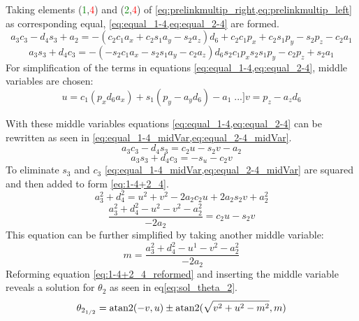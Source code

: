 Taking elements (\textcolor{green}{1},\textcolor{red}{4}) and (\textcolor{green}{2},\textcolor{red}{4}) of \cref{eq:prelinkmultip_right,eq:prelinkmultip_left} as corresponding equal,  \cref{eq:equal_1-4,eq:equal_2-4} are formed.
\begin{equation}\label{eq:equal_1-4}
	a_3 c_3 - d_4 s_3 + a_2 = - (c_2 c_1 a_x + c_2 s_1 a_y -s_2 a_z)d_6 + c_2 c_1 p_x + c_2 s_1 p_y -s_2 p_z -c_2 a_1
\end{equation}
\begin{equation}\label{eq:equal_2-4}
	a_3 s_3 +d_4 c_3 = - (- s_2 c_1 a_x - s_2 s_1 a_y - c_2 a_z)d_6 s_2 c_1 p_x s_2 s_1 p_y  -c_2 p_z +s_2 a_1
\end{equation}
For simplification of the terms in equations \cref{eq:equal_1-4,eq:equal_2-4}, middle variables are chosen:
\begin{equation}
	u=c_1 (p_x d_6 a_x ) + s_1 (p_y -a_y d_6)-a_1 \phantom[...]
	v= p_z - a_z d_6
\end{equation}

With these middle variables equations \cref{eq:equal_1-4,eq:equal_2-4} can be rewritten as seen in \cref{eq:equal_1-4_midVar,eq:equal_2-4_midVar}.
\begin{equation}\label{eq:equal_1-4_midVar}
	a_3 c_3 - d_4 s_3 = c_2 u -s_2 v -a_2 
\end{equation}
\begin{equation}\label{eq:equal_2-4_midVar}
	a_3 s_3 + d_4 c_3 = - s_ u - c_2 v
\end{equation}
To eliminate $s_3$ and $c_3$ \cref{eq:equal_1-4_midVar,eq:equal_2-4_midVar} are squared and then added to form \ref{eq:1-4+2_4}.
\begin{equation}\label{eq:1-4+2_4}
	a_3^2 +d_4^2 = u^2 +v^2 - 2a_2 c_2 u + 2a_2 s_2 v +a_2^2
\end{equation}
\begin{equation}\label{eq:1-4+2_4_reformed}
	\frac{a_3^2 + d_4^2 - u^2 - v^2 -a_2^2}{-2a_2}= c_2 u -s_2 v
\end{equation}
This equation can be further simplified by taking another middle variable:
\begin{equation*}
	m = \frac{a_3^2 +d_4^2 - u^1 -v^2 - a_2^2}{-2a_2}
\end{equation*}
Reforming equation \ref{eq:1-4+2_4_reformed} and inserting the middle variable reveals a solution for $\theta_2$ as seen in eq\ref{eq:sol_theta_2}.
\begin{equation}\label{eq:sol_theta_2}
	\theta_{2_{1/2}} = \operatorname{atan2} (-v , u)\pm \operatorname{atan2}(\sqrt{v^2 +u^2 - m^2 } , m)
\end{equation}




